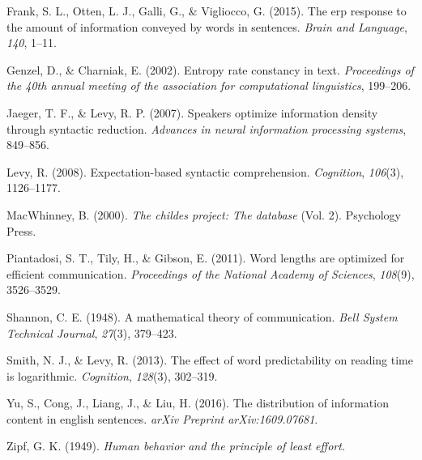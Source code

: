 \documentclass[11pt,]{article}
\begin{document}
\leavevmode\hypertarget{ref-frank2015erp}{}%
Frank, S. L., Otten, L. J., Galli, G., \& Vigliocco, G. (2015). The erp response to the amount of information conveyed by words in sentences. \emph{Brain and Language}, \emph{140}, 1--11.

\leavevmode\hypertarget{ref-genzel2002entropy}{}%
Genzel, D., \& Charniak, E. (2002). Entropy rate constancy in text. \emph{Proceedings of the 40th annual meeting of the association for computational linguistics}, 199--206.

\leavevmode\hypertarget{ref-jaeger2007speakers}{}%
Jaeger, T. F., \& Levy, R. P. (2007). Speakers optimize information density through syntactic reduction. \emph{Advances in neural information processing systems}, 849--856.

\leavevmode\hypertarget{ref-levy2008expectation}{}%
Levy, R. (2008). Expectation-based syntactic comprehension. \emph{Cognition}, \emph{106}(3), 1126--1177.

\leavevmode\hypertarget{ref-macwhinney2000childes}{}%
MacWhinney, B. (2000). \emph{The childes project: The database} (Vol. 2). Psychology Press.

\leavevmode\hypertarget{ref-piantadosi2011word}{}%
Piantadosi, S. T., Tily, H., \& Gibson, E. (2011). Word lengths are optimized for efficient communication. \emph{Proceedings of the National Academy of Sciences}, \emph{108}(9), 3526--3529.

\leavevmode\hypertarget{ref-shannon1948mathematical}{}%
Shannon, C. E. (1948). A mathematical theory of communication. \emph{Bell System Technical Journal}, \emph{27}(3), 379--423.

\leavevmode\hypertarget{ref-smith2013effect}{}%
Smith, N. J., \& Levy, R. (2013). The effect of word predictability on reading time is logarithmic. \emph{Cognition}, \emph{128}(3), 302--319.

\leavevmode\hypertarget{ref-yu2016distribution}{}%
Yu, S., Cong, J., Liang, J., \& Liu, H. (2016). The distribution of information content in english sentences. \emph{arXiv Preprint arXiv:1609.07681}.

\leavevmode\hypertarget{ref-zipf1949human}{}%
Zipf, G. K. (1949). \emph{Human behavior and the principle of least effort.}
\end{document}
